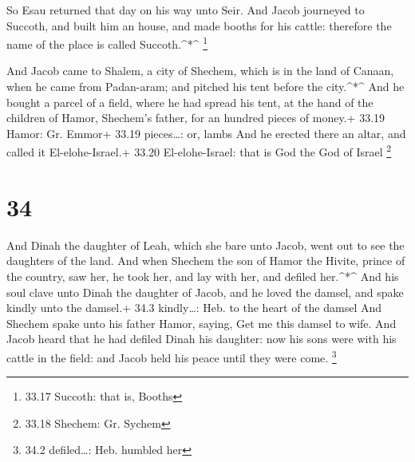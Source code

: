  So Esau returned that day on his way unto Seir.
 And Jacob journeyed to Succoth, and built him an house,
and made booths for his cattle: therefore the name of the place is
called Succoth.\^{}*\^{} \footnote{33.17 Succoth: that is, Booths}

 And Jacob came to Shalem, a city of Shechem, which is in
the land of Canaan, when he came from Padan-aram; and pitched his tent
before the city.\^{}*\^{}  And he bought a parcel of a
field, where he had spread his tent, at the hand of the children of
Hamor, Shechem's father, for an hundred pieces of money.+ 33.19 Hamor:
Gr. Emmor+ 33.19 pieces\ldots: or, lambs  And he erected
there an altar, and called it El-elohe-Israel.+ 33.20 El-elohe-Israel:
that is God the God of Israel \footnote{33.18 Shechem: Gr. Sychem}

\hypertarget{section-33}{%
\section{34}\label{section-33}}

 And Dinah the daughter of Leah, which she bare unto Jacob,
went out to see the daughters of the land.  And when Shechem
the son of Hamor the Hivite, prince of the country, saw her, he took
her, and lay with her, and defiled her.\^{}*\^{}  And his
soul clave unto Dinah the daughter of Jacob, and he loved the damsel,
and spake kindly unto the damsel.+ 34.3 kindly\ldots: Heb. to the heart
of the damsel  And Shechem spake unto his father Hamor,
saying, Get me this damsel to wife.  And Jacob heard that he
had defiled Dinah his daughter: now his sons were with his cattle in the
field: and Jacob held his peace until they were come. \footnote{34.2
  defiled\ldots: Heb. humbled her}

